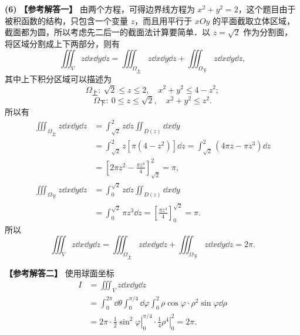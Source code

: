 \begin{solution}
  \textbf{(6)} \textbf{【参考解答一】} 由两个方程，可得边界线方程为 $x^2+y^2=2$，这个题目由于被积函数的结构，只包含一个变量 $z$，而且用平行于 $xOy$ 的平面截取立体区域，截面都为圆，所以考虑先二后一的截面法计算要简单．以 $z=\sqrt{2}$ 作为分割面，将区域分割成上下两部分，则有
  \[
    \iiint_V z\dd x\dd y\dd z
    =\iiint_{\Omega_{\text{上}}}z\dd x\dd y\dd z
    +\iiint_{\Omega_{\text{下}}}z\dd x\dd y\dd z,
  \]
  其中上下积分区域可以描述为
  \[
    \Omega_{\text{上}}:\ \sqrt{2}\le z\le 2,\quad x^2+y^2\le 4-z^2;
  \]
  \[
    \Omega_{\text{下}}:\ 0\le z\le\sqrt{2},\quad x^2+y^2\le z^2.
  \]
  所以有
  \begin{align*}
    \iiint_{\Omega_{\text{上}}}z\dd x\dd y\dd z
    &=\int_{\sqrt{2}}^2 z\dd z\iint_{D(z)}\dd x\dd y\\
    &=\int_{\sqrt{2}}^2 z\left[\pi(4-z^2)\right]\dd z
     =\int_{\sqrt{2}}^2\left(4\pi z-\pi z^3\right)\dd z\\
    &=\left[2\pi z^2-\frac{\pi z^4}{4}\right]_{\sqrt{2}}^2=\pi,\\
    \iiint_{\Omega_{\text{下}}}z\dd x\dd y\dd z
    &=\int_0^{\sqrt{2}} z\dd z\iint_{D(z)}\dd x\dd y\\
    &=\int_0^{\sqrt{2}}\pi z^3\dd z
     =\left[\frac{\pi z^4}{4}\right]_0^{\sqrt{2}}=\pi.
  \end{align*}
  所以
  \[
    \iiint_V z\dd x\dd y\dd z
    =\iiint_{\Omega_{\text{上}}}z\dd x\dd y\dd z
    +\iiint_{\Omega_{\text{下}}}z\dd x\dd y\dd z=2\pi.
  \]

  \textbf{【参考解答二】} 使用球面坐标
  \begin{align*}
    I&=\iiint_V z\dd x\dd y\dd z\\
    &=\int_0^{2\pi}\dd\theta\int_0^{\pi/4}\dd\varphi\int_0^2
      \rho\cos\varphi\cdot\rho^2\sin\varphi\dd\rho\\
    &=2\pi\cdot\frac{1}{2}\left.\sin^2\varphi\right|_0^{\pi/4}
      \cdot\frac{1}{4}\left.\rho^4\right|_0^2=2\pi.
  \end{align*}
\end{solution}

